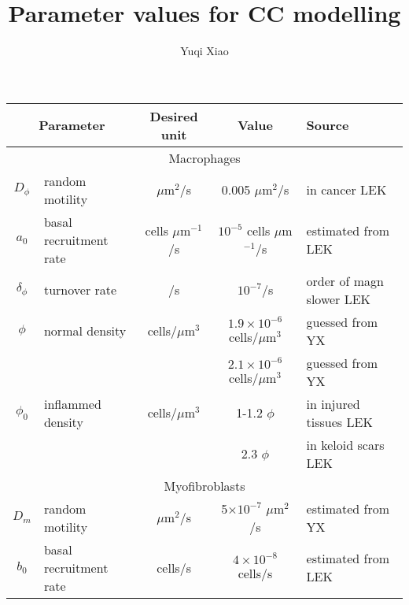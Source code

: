 \documentclass{article}
\title{Parameter values for CC modelling}
\author{Yuqi Xiao}
\begin{document}
\maketitle

    \begin{table}[H]
        \centering
        \begin{tabularx}{\textwidth}{|c|p{3.5cm}|c|c|X|} \hline
        \multicolumn{2}{|c|}{Parameter} & Desired unit & Value & Source \\ \hline
        \multicolumn{5}{|c|}{Macrophages} \\ \hline
        $D_{\phi}$ & random motility & $\mu$m$^2$/s & 0.005 $\mu$m$^2$/s & in cancer \cite{owen1997pattern,khajanchi2021spatiotemporal} LEK\\ \hline

        $a_0$ & basal recruitment rate & cells $\mu$m$^{-1}$/s & $10^{-5}$ cells $\mu$m$^{-1}$/s & estimated from \cite{gupta2006spatiotemporal} LEK\\ \hline

        $\delta_\phi$ & turnover rate & /s & $10^{-7}$/s & order of magn slower \cite{owen1997pattern} LEK \\ \hline

        $\phi$ & normal density & cells/$\mu$m$^3$ & $1.9 \times10^{-6}$ cells/$\mu$m$^3$ & guessed from \cite{degnim2014immune} YX\\ \hline
 
        \multirow{3}{*}{$\phi_0$} & \multirow{3}{*}{inflammed density} & \multirow{3}{*}{cells/$\mu$m$^3$} & $2.1\times10^{-6}$ cells/$\mu$m$^3$ & guessed from \cite{degnim2014immune} YX\\ \cline{4-5}

        & & & 1-1.2 $\phi$ & in injured tissues \cite{gupta2006spatiotemporal} LEK\\ \cline{4-5}

        & & & 2.3 $\phi$ & in keloid scars \cite{boyce2001inflammatory} LEK\\ \hline

        \multicolumn{5}{|c|}{Myofibroblasts} \\ \hline

        $D_m$ & random motility & $\mu$m$^2$/s & 5$\times 10^{-7}$ $\mu$m$^2$/s & estimated from \cite{thampatty2007new} YX\\ \hline

        $b_0$ & basal recruitment rate & cells/s & $4 \times 10^{-8}$ cells/s& estimated from \cite{masur1996myofibroblasts,gascard2016carcinoma} \newline LEK\\ \hline
        

\end{tabularx}
\end{table}
\end{document}
